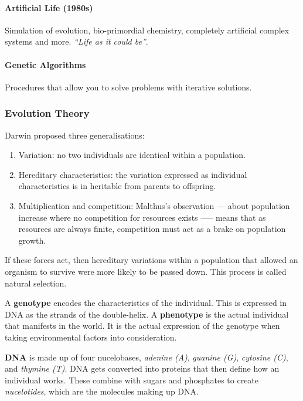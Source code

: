 \paragraph{Artificial Life (1980s)} Simulation of evolution, bio-primordial chemistry, completely artificial complex systems and more. \textit{``Life as it could be''}.

\paragraph{Genetic Algorithms} Procedures that allow you to solve problems with iterative solutions.

\subsubsection{Evolution Theory}

Darwin proposed three generalisations:

\begin{enumerate}
    \item Variation: no two individuals are identical within a population.
    \item Hereditary characteristics: the variation expressed as individual characteristics is in heritable from parents to offspring.
    \item Multiplication and competition: Malthus’s observation --- about population increase where no competition for resources exists —-- means that as resources are always finite, competition must act as a brake on population growth.
\end{enumerate}

If these forces act, then hereditary variations within a population that allowed an organism to survive were more likely to be passed down. This process is called natural selection.

A \textbf{genotype} encodes the characteristics of the individual. This is expressed in DNA as the strands of the double-helix. A \textbf{phenotype} is the actual individual that manifests in the world. It is the actual expression of the genotype when taking environmental factors into consideration.

\textbf{DNA} is made up of four nucelobases, \textit{adenine (A)}, \textit{guanine (G)}, \textit{cytosine (C)}, and \textit{thymine (T)}. DNA gets converted into proteins that then define how an individual works. These combine with sugars and phosphates to create \textit{nucelotides}, which are the molecules making up DNA.

